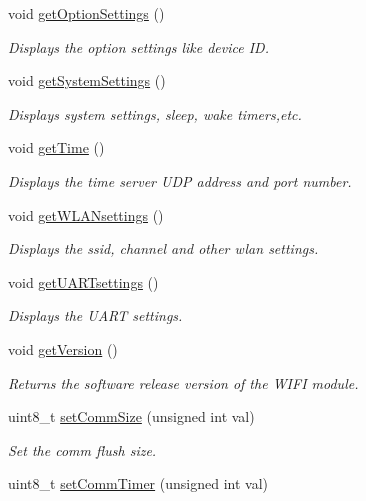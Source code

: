 \begin{DoxyCompactItemize}
void \hyperlink{class_wasp_w_i_f_i_aaef4a957ef407023f3ae4b88e4dfa5e6}{get\+Option\+Settings} ()
\begin{DoxyCompactList}\small\item\em Displays the option settings like device ID. \end{DoxyCompactList}\item 
void \hyperlink{class_wasp_w_i_f_i_ac9be40db9689db047a72c8e8de37c59a}{get\+System\+Settings} ()
\begin{DoxyCompactList}\small\item\em Displays system settings, sleep, wake timers,etc. \end{DoxyCompactList}\item 
void \hyperlink{class_wasp_w_i_f_i_a54594882608b9fdb8c70c0797975900f}{get\+Time} ()
\begin{DoxyCompactList}\small\item\em Displays the time server U\+DP address and port number. \end{DoxyCompactList}\item 
void \hyperlink{class_wasp_w_i_f_i_a77854c7b42854a0b0ce23fd78299acae}{get\+W\+L\+A\+Nsettings} ()
\begin{DoxyCompactList}\small\item\em Displays the ssid, channel and other wlan settings. \end{DoxyCompactList}\item 
void \hyperlink{class_wasp_w_i_f_i_a4b3c312625130e697c2048a070241b4b}{get\+U\+A\+R\+Tsettings} ()
\begin{DoxyCompactList}\small\item\em Displays the U\+A\+RT settings. \end{DoxyCompactList}\item 
void \hyperlink{class_wasp_w_i_f_i_a54b58818f08d14ece4508f08d174b88c}{get\+Version} ()
\begin{DoxyCompactList}\small\item\em Returns the software release version of the W\+I\+FI module. \end{DoxyCompactList}\item 
uint8\+\_\+t \hyperlink{class_wasp_w_i_f_i_a674876548dfab261252aee032ed643d6}{set\+Comm\+Size} (unsigned int val)
\begin{DoxyCompactList}\small\item\em Set the comm flush size. \end{DoxyCompactList}\item 
uint8\+\_\+t \hyperlink{class_wasp_w_i_f_i_af2b5417e79b3ed11243ba1c40fcb7d6c}{set\+Comm\+Timer} (unsigned int val)

\end{DoxyCompactItemize}
